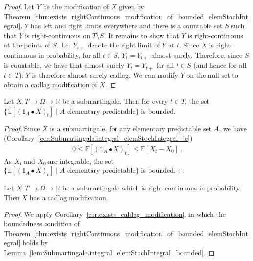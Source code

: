 \begin{proof}\leanok
Let $Y$ be the modification of $X$ given by Theorem~\ref{thm:exists_rightContinuous_modification_of_bounded_elemStochIntegral}.
$Y$ has left and right limits everywhere and there is a countable set $S$ such that $Y$ is right-continuous on $T \setminus S$. It remains to show that $Y$ is right-continuous at the points of $S$.
Let $Y_{t+}$ denote the right limit of $Y$ at $t$.
Since $X$ is right-continuous in probability, for all $t \in S$, $Y_t = Y_{t+}$ almost surely.
Therefore, since $S$ is countable, we have that almost surely $Y_t = Y_{t+}$ for all $t \in S$ (and hence for all $t \in T$).
$Y$ is therefore almost surely cadlag.
We can modify $Y$ on the null set to obtain a cadlag modification of $X$.
\end{proof}


\begin{lemma}\label{lem:Submartingale.integral_elemStochIntegral_bounded}
Let $X : T \to \Omega \to \mathbb{R}$ be a submartingale.
Then for every $t \in T$, the set $\{\mathbb{E}[(\mathbb{1}_A \bullet X)_t] \mid A \text{ elementary predictable}\}$ is bounded.
\end{lemma}

\begin{proof}
Since $X$ is a submartingale, for any elementary predictable set $A$, we have (Corollary~\ref{cor:Submartingale.integral_elemStochIntegral_le})
\begin{align*}
  0 \le \mathbb{E}[(\mathbb{1}_A \bullet X)_t] \le \mathbb{E}[X_t - X_0]
  \:.
\end{align*}
As $X_t$ and $X_0$ are integrable, the set $\{\mathbb{E}[(\mathbb{1}_A \bullet X)_t] \mid A \text{ elementary predictable}\}$ is bounded.
\end{proof}


\begin{lemma}\label{lem:Submartingale.exists_cadlag_modification_of_rightContinuous}
Let $X : T \to \Omega \to \mathbb{R}$ be a submartingale which is right-continuous in probability.
Then $X$ has a cadlag modification.
\end{lemma}

\begin{proof}
We apply Corollary~\ref{cor:exists_caldag_modification}, in which the boundedness condition of Theorem~\ref{thm:exists_rightContinuous_modification_of_bounded_elemStochIntegral} holds by Lemma~\ref{lem:Submartingale.integral_elemStochIntegral_bounded}.
\end{proof}


